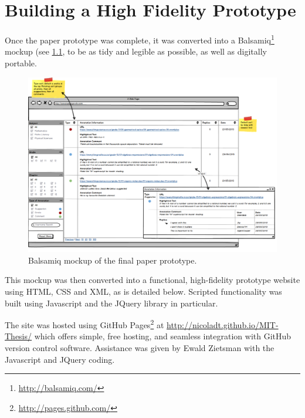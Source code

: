 
\chapter{Building a High Fidelity Prototype} %

\label{Building a High Fidelity Prototype} %



Once the paper prototype was complete, it was converted into a Balsamiq\footnote{\href{http://balsamiq.com/}{http://balsamiq.com/}} mockup (see \ref{fig:Balsamiq}, to be as tidy and legible as possible, as well as digitally portable.
\begin{figure}[h!]
    \centering
    \includegraphics[width=\textwidth]{Figures/BalsamiqMockup.png}
 \caption{Balsamiq mockup of the final paper prototype.	}
 \label{fig:Balsamiq}
\end{figure}

This mockup was then converted into a functional, high-fidelity prototype website using HTML, CSS and XML, as is detailed below. Scripted functionality was built using Javascript and the JQuery library in particular.  

The site was hosted using GitHub Pages\footnote{\href{http://pages.github.com/}{ http://pages.github.com/}} at \href{http://nicoladt.github.io/MIT-Thesis/}{http://nicoladt.github.io/MIT-Thesis/} which offers simple, free hosting, and seamless integration with GitHub version control software. Assistance was given by Ewald Zietsman with the Javascript and JQuery coding. 

